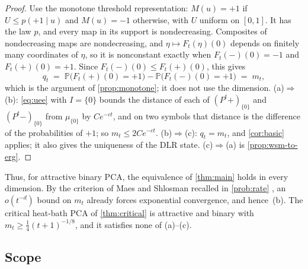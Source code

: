 \documentclass[11pt]{article}
\theoremstyle{plain}
\theoremstyle{definition}
\theoremstyle{remark}
\newcommand{\Prob}{\mathbb{P}}
\begin{document}
\begin{proof}
Use the monotone threshold representation: $M(u)=+1$ if $U\le p(+1\mid u)$ and $M(u)=-1$ otherwise, with $U$ uniform on $[0,1]$. It has the law $p$, and every map in its support is nondecreasing. Composites of nondecreasing maps are nondecreasing, and $\eta\mapsto F_t(\eta)(0)$ depends on finitely many coordinates of $\eta$, so it is nonconstant exactly when $F_t(\mathbf-)(0)=-1$ and $F_t(\mathbf+)(0)=+1$. Since $F_t(\mathbf-)(0)\le F_t(\mathbf+)(0)$, this gives
\[
q_t\;=\;\Prob\bigl(F_t(\mathbf+)(0)=+1\bigr)-\Prob\bigl(F_t(\mathbf-)(0)=+1\bigr)\;=\;m_t,
\]
which is the argument of \cref{prop:monotone}; it does not use the dimension. (a)$\Rightarrow$(b): \eqref{eq:uee} with $I=\{0\}$ bounds the distance of each of $(P^t\mathbf+)_{\{0\}}$ and $(P^t\mathbf-)_{\{0\}}$ from $\mu_{\{0\}}$ by $Ce^{-ct}$, and on two symbols that distance is the difference of the probabilities of $+1$; so $m_t\le2Ce^{-ct}$. (b)$\Rightarrow$(c): $q_t=m_t$, and \cref{cor:basic} applies; it also gives the uniqueness of the DLR state. (c)$\Rightarrow$(a) is \cref{prop:wsm-to-erg}.
\end{proof}

Thus, for attractive binary PCA, the equivalence of \cref{thm:main} holds in every dimension. By the criterion of Maes and Shlosman recalled in \cref{prob:rate} \cite[Corollary~2, eq.~(4.10)]{MS93}, an $o(t^{-d})$ bound on $m_t$ already forces exponential convergence, and hence~(b). The critical heat-bath PCA of \cref{thm:critical} is attractive and binary with $m_t\ge\frac14(t+1)^{-1/8}$, and it satisfies none of (a)--(c).

\subsection{Scope}
\end{document}
